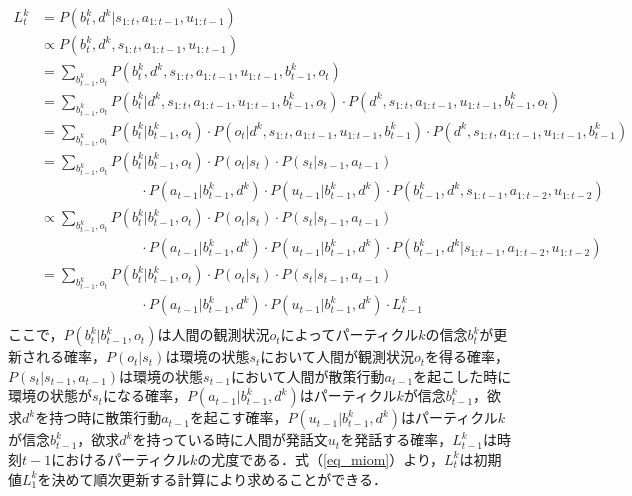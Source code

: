 \begin{equation}
  \begin{split}
  \label{eq_miom}
  L^k_t&=P(b_t^k,d^k|s_{1:t},a_{1:t-1},u_{1:t-1})\\
  &\propto P(b_t^k,d^k,s_{1:t},a_{1:t-1},u_{1:t-1})\\
  &= \sum_{b_{t-1}^k,o_t}P(b_t^k,d^k,s_{1:t},a_{1:t-1},u_{1:t-1},b_{t-1}^k,o_t)\\
  &= \sum_{b_{t-1}^k,o_t}P(b_t^k|d^k,s_{1:t},a_{1:t-1},u_{1:t-1},b_{t-1}^k,o_t)\cdot P(d^k,s_{1:t},a_{1:t-1},u_{1:t-1},b_{t-1}^k,o_t)\\
  &= \sum_{b_{t-1}^k,o_t}P(b_t^k|b_{t-1}^k,o_t)\cdot P(o_t|d^k,s_{1:t},a_{1:t-1},u_{1:t-1},b_{t-1}^k)\cdot P(d^k,s_{1:t},a_{1:t-1},u_{1:t-1},b_{t-1}^k)\\
  &= \sum_{b_{t-1}^k,o_t}P(b_t^k|b_{t-1}^k,o_t)\cdot P(o_t|s_t)\cdot P(s_t|s_{t-1},a_{t-1})\\
  &\hspace{3cm} \cdot P(a_{t-1}|b_{t-1}^k,d^k)\cdot P(u_{t-1}|b_{t-1}^k,d^k)\cdot P(b_{t-1}^k,d^k,s_{1:t-1},a_{1:t-2},u_{1:t-2})\\
  &\propto \sum_{b_{t-1}^k,o_t}P(b_t^k|b_{t-1}^k,o_t)\cdot P(o_t|s_t)\cdot P(s_t|s_{t-1},a_{t-1})\\
  &\hspace{3cm} \cdot P(a_{t-1}|b_{t-1}^k,d^k)\cdot P(u_{t-1}|b_{t-1}^k,d^k)\cdot P(b_{t-1}^k,d^k|s_{1:t-1},a_{1:t-2},u_{1:t-2})\\
  &= \sum_{b_{t-1}^k,o_t}P(b_t^k|b_{t-1}^k,o_t)\cdot P(o_t|s_t)\cdot P(s_t|s_{t-1},a_{t-1})\\
  &\hspace{3cm} \cdot P(a_{t-1}|b_{t-1}^k,d^k)\cdot P(u_{t-1}|b_{t-1}^k,d^k)\cdot L^k_{t-1}\\
  \end{split}
\end{equation}
ここで，$P(b_t^k|b_{t-1}^k,o_t)$は人間の観測状況$o_t$によってパーティクル$k$の信念$b_t^k$が更新される確率，$P(o_t|s_t)$は環境の状態$s_t$において人間が観測状況$o_t$を得る確率，$P(s_t|s_{t-1},a_{t-1})$は環境の状態$s_{t-1}$において人間が散策行動$a_{t-1}$を起こした時に環境の状態が$s_{t}$になる確率，$P(a_{t-1}|b_{t-1}^k,d^k)$はパーティクル$k$が信念$b_{t-1}^k$，欲求$d^k$を持つ時に散策行動$a_{t-1}$を起こす確率，$P(u_{t-1}|b_{t-1}^k,d^k)$はパーティクル$k$が信念$b_{t-1}^k$，欲求$d^k$を持っている時に人間が発話文$u_t$を発話する確率，$L_{t-1}^k$は時刻$t-1$におけるパーティクル$k$の尤度である．式（\ref{eq_miom}）より，$L^k_t$は初期値$L^k_1$を決めて順次更新する計算により求めることができる．

